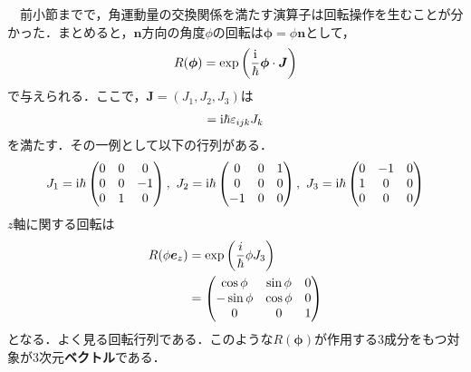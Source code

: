 \documentclass{report}
\begin{document}
　前小節までで，角運動量の交換関係を満たす演算子は回転操作を生むことが分かった．まとめると，$\bm{n}$方向の角度$\phi$の回転は$\bm{\phi} = \phi\bm{n}$として，
\begin{align}
  R(\bm{\phi}) = \exp\qty(\frac{\mathrm{i}}{\hbar}\bm{\phi}\cdot\bm{J})
\end{align}
で与えられる．ここで，$\bm{J} = (J_1,J_2,J_3)$は
\begin{align}
  [J_i,J_j] = \i\hbar\epsilon_{ijk}J_k
\end{align}
を満たす．その一例として以下の行列がある．
\begin{align}
  J_1 = \i\hbar
  \begin{pmatrix}
    0 & 0 & 0\\
    0 & 0 & -1\\
    0 & 1 & 0
  \end{pmatrix}
  ,\ 
  J_2 = \i\hbar
  \begin{pmatrix}
    0 & 0 & 1\\
    0 & 0 & 0\\
    -1 & 0 & 0
  \end{pmatrix}
  ,\ 
  J_3 = \i\hbar
  \begin{pmatrix}
    0 & -1 & 0\\
    1 & 0 & 0\\
    0 & 0 & 0
  \end{pmatrix}
\end{align}
$z$軸に関する回転は
\begin{align}
  R(\phi\bm{e}_z) &= \exp\qty(\frac{i}{\hbar}\phi J_3)\\
  &= 
  \begin{pmatrix}
    \cos\phi & \sin\phi & 0\\
    -\sin\phi & \cos\phi & 0\\
    0 & 0 & 1
  \end{pmatrix}
\end{align}
となる．よく見る回転行列である．このような$R(\bm{\phi})$が作用する3成分をもつ対象が3次元\textbf{ベクトル}である．
\end{document}
